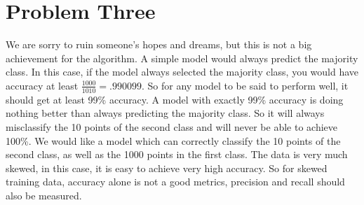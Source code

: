 \documentclass{article}
\begin{document}
\section{Problem Three}
We are sorry to ruin someone's hopes and dreams, but this is not a big achievement for the algorithm. A simple model would always predict the majority class. In this case, if the model always selected the majority class, you would have accuracy at least $\frac{1000}{1010}=.990099$. So for any model to be said to perform well, it should get at least 99\% accuracy. A model with exactly 99\% accuracy is doing nothing better than always predicting the majority class. So it will always misclassify the 10 points of the second class and will never be able to achieve 100\%. We would like a model which can correctly classify the 10 points of the second class, as well as the 1000 points in the first class. The data is very much skewed, in this case, it is easy to achieve very high accuracy. So for skewed training data, accuracy alone is not a good metrics, precision and recall should also be measured.   
\end{document}
